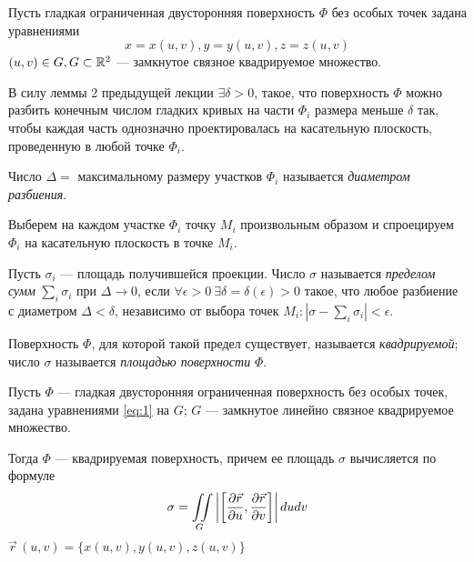 \documentclass[a4paper,10pt]{article}
\begin{document}
	
	\jeolmnewheader
	
	Пусть гладкая ограниченная двусторонняя поверхность $\Phi$ без особых точек задана уравнениями
	\begin{equation}\label{eq:1}
		x = x(u, v), y=y(u, v), z = z(u, v)
	\end{equation}
	$(u, v) \in G, G \subset {\mathbb R}^2$ --- замкнутое связное квадрируемое множество. 
	
	В силу леммы 2 предыдущей лекции $\exists \delta > 0$, такое, что поверхность $\Phi$ можно разбить конечным числом гладких кривых на части $\Phi_i$ размера меньше $\delta$ так, чтобы каждая часть однозначно проектировалась на касательную плоскость, проведенную в любой точке $\Phi_i$.
	
	\begin{defn}
		Число $\Delta =$ максимальному размеру участков $\Phi_i$ называется \textit{диаметром разбиения}.
	\end{defn}
	
	\begin{defn}
		Выберем на каждом участке $\Phi_i$ точку $M_i$ произвольным образом и спроецируем $\Phi_i$ на касательную плоскость в точке $M_i$.

		Пусть $\sigma_i$ --- площадь получившейся проекции. Число $\sigma$ называется \textit{пределом сумм} $\sum\limits_i \sigma_i$ при $\Delta \to 0$, если $\forall \epsilon > 0 ~ \exists \delta = \delta (\epsilon) > 0$ такое, что любое разбиение с диаметром $\Delta < \delta$, независимо от выбора точек $M_i : \left|\sigma - \sum\limits_i \sigma_i\right| < \epsilon$.
	
		Поверхность $\Phi$, для которой такой предел существует, называется \textit{квадрируемой}; число $\sigma$ называется \textit{площадью поверхности} $\Phi$.
	\end{defn}

	
	\begin{thm}\label{thm:1}
		Пусть $\Phi$ --- гладкая двусторонняя ограниченная поверхность без особых точек, задана уравнениями \eqref{eq:1} на $G$; $G$ --- замкнутое линейно связное квадрируемое множество.
		
		Тогда $\Phi$ --- квадрируемая поверхность, причем ее площадь $\sigma$ вычисляется по формуле
		\begin{equation}\label{eq:2}
			\sigma = \iint\limits_G \left| \left[ \dfrac{\partial \vec{r}}{\partial u}, \dfrac{\partial \vec{r}}{\partial v} \right] \right| dudv
		\end{equation}
		$\vec{r}\,(u, v) = \{x(u, v), y(u, v), z(u, v)\}$
	\end{thm}
\end{document}
